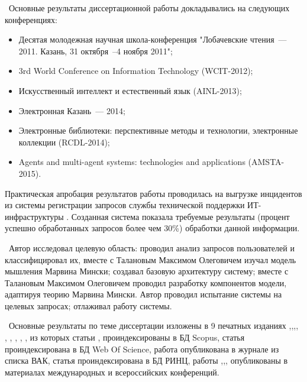\probation\
 Основные результаты диссертационной работы докладывались на следующих конференциях:
\begin{itemize}
	\item Десятая молодежная научная школа-конференция "Лобачевские чтения~---2011. Казань, 31 октября~--4 ноября 2011";
	\item 3rd World Conference on Information Technology (WCIT-2012); 
	\item Искусственный интеллект и естественный язык (AINL-2013);
	\item Электронная Казань~--- 2014;
	\item Электронные библиотеки: перспективные методы и технологии, электронные коллекции (RCDL-2014);
	\item Agents and multi-agent systems: technologies and applications (AMSTA-2015).
\end{itemize}
Практическая апробация результатов работы проводилась на выгрузке инцидентов из системы регистрации запросов службы технической поддержки ИТ-инфраструктуры \icl. Созданная система показала требуемые результаты (процент успешно обработанных запросов более чем 30\%) обработки данной информации. \par
\contribution\ Автор исследовал целевую область: проводил анализ запросов пользователей и классифицировал их, вместе с Талановым Максимом Олеговичем изучал модель мышления Марвина Мински; создавал базовую архитектуру систему; вместе с Талановым Максимом Олеговичем проводил разработку компонентов модели, адаптируя теорию Марвина Мински. Автор проводил испытание системы на целевых запросах; отлаживал работу системы. \par
\publications\ Основные результаты по теме диссертации изложены в 9 печатных изданиях  \cite{Lobachevskii},\cite{WCIT-2012},\cite{AINL-2013},\cite{ISGZ}, \cite{IJSE-1}, \cite{IJSE-2}, \cite{RCDL-2014}, \cite{AMSTA-2015}, \cite{VAK-1}, из которых статьи \cite{RCDL-2014},\cite{AMSTA-2015} проиндексированы в БД Scopus, статья \cite{AMSTA-2015} проиндексирована в БД Web Of Science, работа \cite{VAK-1} опубликована в журнале из списка ВАК, статья  \cite{ISGZ} проиндексирована в БД РИНЦ, работы \cite{Lobachevskii},\cite{WCIT-2012},\cite{AINL-2013},\cite{ISGZ} опубликованы в материалах международных и всероссийских конференций.




\renewcommand{\refname}{\large Публикации автора по теме диссертации}

\insertbiblioall

